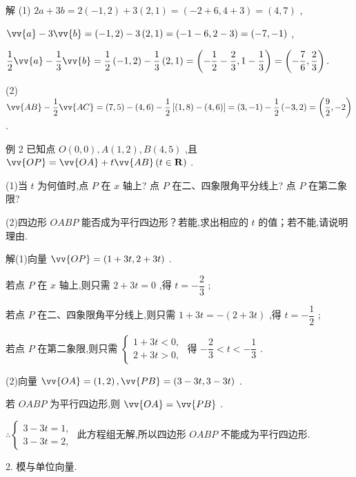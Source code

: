 解 (1) ${2a} + {3b} = 2\left( {-1,2}\right)  + 3\left( {2,1}\right)  = \left( {-2 + 6,4 + 3}\right)  = \left( {4,7}\right)$ ,

$\vv{a} - 3\vv{b} = \left( {-1,2}\right)  - 3\left( {2,1}\right)  = \left( {-1 - 6,2 - 3}\right)  = \left( {-7, - 1}\right)$ ,

$\dfrac{1}{2}\vv{a} - \dfrac{1}{3}\vv{b} = \dfrac{1}{2}\left( {-1,2}\right)  - \dfrac{1}{3}\left( {2,1}\right)  = \left( {-\dfrac{1}{2} - \dfrac{2}{3},1 - \dfrac{1}{3}}\right)  = \left( {-\dfrac{7}{6},\dfrac{2}{3}}\right) .$

(2) $\vv{AB} - \dfrac{1}{2}\vv{AC} = \left( {7,5}\right)  - \left( {4,6}\right)  - \dfrac{1}{2}\left\lbrack  {\left( {1,8}\right)  - \left( {4,6}\right) }\right\rbrack   = \left( {3, - 1}\right)  - \dfrac{1}{2}\left( {-3,2}\right)  = \left( {\dfrac{9}{2}, - 2}\right)$ .

例 2 已知点 $O\left( {0,0}\right) ,A\left( {1,2}\right) ,B\left( {4,5}\right)$ ,且 $\vv{OP} = \vv{OA} + t\vv{AB}\left( {t \in  \mathbf{R}}\right)$ .

(1)当 $t$ 为何值时,点 $P$ 在 $x$ 轴上? 点 $P$ 在二、四象限角平分线上? 点 $P$ 在第二象限?

(2)四边形 ${OABP}$ 能否成为平行四边形？若能,求出相应的 $t$ 的值；若不能,请说明理由.

解(1)向量 $\vv{OP} = \left( {1 + {3t},2 + {3t}}\right)$ .

若点 $P$ 在 $x$ 轴上,则只需 $2 + {3t} = 0$ ,得 $t =  - \dfrac{2}{3}$ ;

若点 $P$ 在二、四象限角平分线上,则只需 $1 + {3t} =  - \left( {2 + {3t}}\right)$ ,得 $t =  - \dfrac{1}{2}$ ;

若点 $P$ 在第二象限,则只需 $\left\{  \begin{array}{l} 1 + {3t} < 0, \\  2 + {3t} > 0, \end{array}\right.$ 得 $- \dfrac{2}{3} < t <  - \dfrac{1}{3}$ .

(2)向量 $\vv{OA} = \left( {1,2}\right) ,\vv{PB} = \left( {3 - {3t},3 - {3t}}\right)$ .

若 ${OABP}$ 为平行四边形,则 $\vv{OA} = \vv{PB}$ .

$\therefore \left\{  \begin{array}{l} 3 - {3t} = 1, \\  3 - {3t} = 2, \end{array}\right.$ 此方程组无解,所以四边形 ${OABP}$ 不能成为平行四边形.

2. 模与单位向量.


